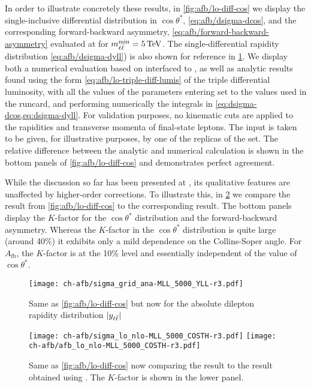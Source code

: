 In order to illustrate concretely these results,  
in \cref{fig:afb/lo-diff-cos} we display the
single-inclusive differential distribution in $\cos\theta^*$,
\cref{eq:afb/dsigma-dcos},
and the corresponding forward-backward asymmetry,
\cref{eq:afb/forward-backward-asymmetry} evaluated at \lo
for $\mll^{\text{min}}=\SI{5}{\TeV}$. The single-differential rapidity
distribution \cref{eq:afb/dsigma-dyll}) is also shown for reference in \cref{fig:afb/lo-diff-yll}.
%
We display both a numerical evaluation based on \mgamc interfaced to \pineappl,
as well as analytic results found using the form \cref{eq:afb/lo-triple-diff-lumis}
of the triple differential luminosity, with all the values of the parameters
entering  set to the values used in the \mgamc
runcard, and performing  numerically the integrals in
\cref{eq:dsigma-dcos,eq:dsigma-dyll}.
%
For validation purposes, no kinematic cuts are applied to the rapidities and
transverse momenta of final-state leptons.
The \pdf input is taken to be given, for illustrative purposes, by one of the
replicas of the  \nnlo set.
The relative difference between the analytic and numerical calculation is shown
in the bottom panels of \cref{fig:afb/lo-diff-cos} and demonstrates perfect
agreement. 

While the discussion so far has been presented  at \lo, its qualitative
features are unaffected by  higher-order corrections.
%
To illustrate this, in \cref{fig:afb/lo-kfact} we compare the \lo result  from
\cref{fig:afb/lo-diff-cos} to the corresponding \nlo \qcd result.
%
The bottom panels display the \nlo $K$-factor for the $\cos\theta^*$
distribution and the forward-backward asymmetry.
%
Whereas the \nlo $K$-factor in the $\cos\theta^*$ distribution is quite large
(around 40\%) it exhibits only a mild dependence on the Collins-Soper angle.
%
For $A_{\text{fb}}$, the $K$-factor is at the 10\% level and essentially
independent of the value of $\cos\theta^*$.

\begin{figure}[t]
  \centering
  \texttt{[image: ch-afb/sigma\_grid\_ana-MLL\_5000\_YLL-r3.pdf]}
  \caption{Same as \cref{fig:afb/lo-diff-cos} but now for the absolute dilepton rapidity distribution $|y_{\ell\bar{\ell}}|$}
  \label{fig:afb/lo-diff-yll}
\end{figure}
 
\begin{figure}[t]
  \centering
  \texttt{[image: ch-afb/sigma\_lo\_nlo-MLL\_5000\_COSTH-r3.pdf]}
  \texttt{[image: ch-afb/afb\_lo\_nlo-MLL\_5000\_COSTH-r3.pdf]}
  \caption{Same as \cref{fig:afb/lo-diff-cos} now comparing the \lo result
    to the \nlo \qcd result obtained using \mgamc.
    The $K$-factor is shown in the lower panel.
  }
  \label{fig:afb/lo-kfact}
\end{figure}
